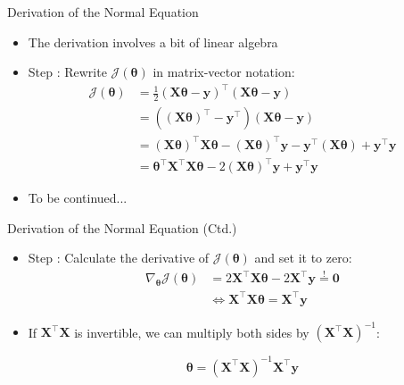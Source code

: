\begin{frame}{Derivation of the Normal Equation}{}\optional
	\begin{itemize}
		\item The derivation involves a bit of linear algebra
		\item Step : Rewrite $\mathcal{J}(\bm{\theta})$ in matrix-vector notation:
		\begin{align*}
			\mathcal{J}(\bm{\theta})
				&= \frac{1}{2}(\bm{X} \bm{\theta} - \bm{y})^{\intercal} (\bm{X} \bm{\theta} - \bm{y}) \\
				&= ((\bm{X} \bm{\theta})^{\intercal} - \bm{y}^{\intercal}) (\bm{X} \bm{\theta} - \bm{y}) \\
				&= (\bm{X} \bm{\theta})^{\intercal} \bm{X} \bm{\theta} - (\bm{X} \bm{\theta})^{\intercal} \bm{y}
					- \bm{y}^{\intercal} (\bm{X} \bm{\theta}) + \bm{y}^{\intercal} \bm{y} \\
				&= \bm{\theta}^{\intercal} \bm{X}^{\intercal} \bm{X} \bm{\theta}
					- 2 (\bm{X} \bm{\theta})^{\intercal} \bm{y} + \bm{y}^{\intercal} \bm{y}
		\end{align*}
		\item To be continued...
	\end{itemize}
\end{frame}


\begin{frame}{Derivation of the Normal Equation (Ctd.)}{}\optional
	\begin{itemize}
		\item Step : Calculate the derivative of $\mathcal{J}(\bm{\theta})$ and set it to zero:
		\begin{align*}
			\nabla_{\bm{\theta}}\mathcal{J}(\bm{\theta})
				&= 2 \bm{X}^{\intercal} \bm{X} \bm{\theta} - 2 \bm{X}^{\intercal} \bm{y} \overset{!}{=} \bm{0} \\	
				&\Leftrightarrow \bm{X}^{\intercal} \bm{X} \bm{\theta} = \bm{X}^{\intercal} \bm{y}
		\end{align*}
		\item If $\bm{X}^{\intercal} \bm{X}$ is invertible, we can multiply both sides by
			$(\bm{X}^{\intercal} \bm{X})^{-1}$:
		\vspace*{3mm}
		\begin{boxBlueNoFrame}
			\begin{equation*}
				\bm{\theta} = (\bm{X}^{\intercal} \bm{X})^{-1} \bm{X}^{\intercal} \bm{y}
			\end{equation*}
		\end{boxBlueNoFrame}
	\end{itemize}
\end{frame}


